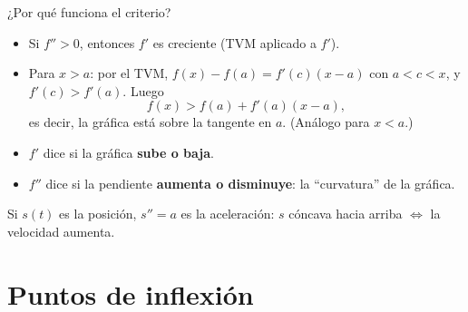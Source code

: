 \documentclass[10pt,aspectratio=169]{beamer}
\begin{document}
\begin{frame}{¿Por qué funciona el criterio?}
  \begin{itemize}
    \item Si $f''>0$, entonces $f'$ es creciente (TVM aplicado a $f'$).
    \item Para $x>a$: por el TVM, $f(x)-f(a)=f'(c)(x-a)$ con $a<c<x$, y $f'(c)>f'(a)$. Luego
      \[ f(x)>f(a)+f'(a)(x-a), \]
      es decir, la gráfica está sobre la tangente en $a$. (Análogo para $x<a$.)
  \end{itemize}
  \begin{idea}
    \begin{itemize}
      \item $f'$ dice si la gráfica \textbf{sube o baja}.
      \item $f''$ dice si la pendiente \textbf{aumenta o disminuye}: la ``curvatura'' de la gráfica.
    \end{itemize}
  \end{idea}
  \begin{ejemplo}[física]
    Si $s(t)$ es la posición, $s''=a$ es la aceleración: $s$ cóncava hacia arriba $\iff$ la velocidad aumenta.
  \end{ejemplo}
\end{frame}

\section{Puntos de inflexión}
\end{document}
